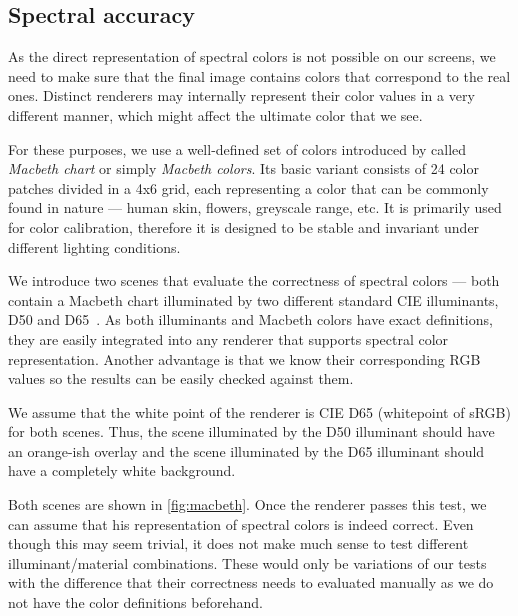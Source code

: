 \subsection{Spectral accuracy}

As the direct representation of spectral colors is not possible on our screens, we need to make sure that the final image contains colors that correspond to the real ones. Distinct renderers may internally represent their color values in a very different manner, which might affect the ultimate color that we see.

For these purposes, we use a well-defined set of colors introduced by \citet{mccamy1976color} called \emph{Macbeth chart} or simply \emph{Macbeth colors}. Its basic variant consists of 24 color patches divided in a 4x6 grid, each representing a color that can be commonly found in nature --- human skin, flowers, greyscale range, etc. It is primarily used for color calibration, therefore it is designed to be stable and invariant under different lighting conditions.

We introduce two scenes that evaluate the correctness of spectral colors --- both contain a Macbeth chart illuminated by two different standard CIE illuminants, D50 and D65~\cite{cieIlluminants}. As both illuminants and Macbeth colors have exact definitions, they are easily integrated into any renderer that supports spectral color representation. Another advantage is that we know their corresponding RGB values so the results can be easily checked against them.

We assume that the white point of the renderer is CIE D65 (whitepoint of sRGB) for both scenes. Thus, the scene illuminated by the D50 illuminant should have an orange-ish overlay and the scene illuminated by the D65 illuminant should have a completely white background.

Both scenes are shown in \autoref{fig:macbeth}. Once the renderer passes this test, we can assume that his representation of spectral colors is indeed correct. Even though this may seem trivial, it does not make much sense to test different illuminant/material combinations. These would only be variations of our tests with the difference that their correctness needs to evaluated manually as we do not have the color definitions beforehand.

